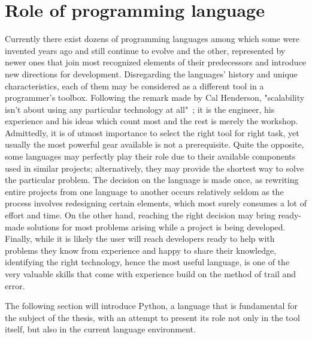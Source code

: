 \section{Role of programming language}\label{sec:languages}
Currently there exist dozens of programming languages among which some were invented years ago and still continue to evolve and the other, represented by newer ones that join most recognized elements of their predecessors and introduce new directions for development. Disregarding the languages' history and unique characteristics, each of them may be considered as a different tool in a programmer's toolbox. Following the remark made by Cal Henderson, "scalability isn't about using any particular technology at all"~\cite[page 203]{build_scalable}; it is the engineer, his experience and his ideas which count most and the rest is merely the workshop. Admittedly, it is of utmost importance to select the right tool for right task, yet usually the most powerful gear available is not a prerequisite. Quite the opposite, some languages may perfectly play their role due to their available components used in similar projects; alternatively, they may provide the shortest way to solve the particular problem. The decision on the language is made once, as rewriting entire projects from one language to another occurs relatively seldom as the process involves redesigning certain elements, which most surely consumes a lot of effort and time. On the other hand, reaching the right decision may bring ready-made solutions for most problems arising while a project is being developed. Finally, while it is likely the user will reach developers ready to help with problems they know from experience and happy to share their knowledge, identifying the right technology, hence the most useful language, is one of the very valuable skills that come with experience build on the method of trail and error. 

The following section will introduce Python, a language that is fundamental for the subject of the thesis, with an attempt to present its role not only in the tool itself, but also in the current language environment.
  
